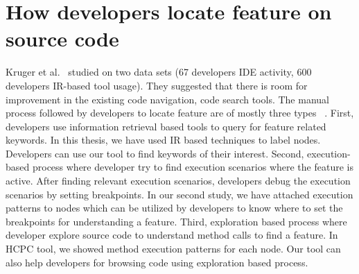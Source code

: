 \section{How developers locate feature on source code}
\label{related:feature_locate}
Kruger et al.~\cite{kruger2019features} studied on two data sets (67 developers IDE activity, 600 developers IR-based tool usage). They suggested that there is room for improvement in the existing code navigation, code search tools. The manual process followed by developers to locate feature are of mostly three types ~\cite{damevski2016field, wang2011exploratory, revelle2005understanding}. First, developers use information retrieval based tools to query for feature related keywords. In this thesis, we have used IR based techniques to label nodes. Developers can use our tool to find keywords of their interest. Second, execution-based process where developer try to find execution scenarios where the feature is active. After finding relevant execution scenarios, developers debug the execution scenarios by setting breakpoints. In our second study, we have attached execution patterns to nodes which can be utilized by developers to know where to set the breakpoints for understanding a feature. Third, exploration based process where developer explore source code to understand method calls to find a feature. In HCPC tool, we showed method execution patterns for each node. Our tool can also help developers for browsing code using exploration based process.
